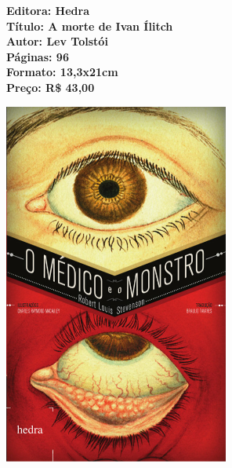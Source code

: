 \vfill

\noindent\begin{minipage}[c]{1\linewidth}
{\small\textbf{
\hspace*{-.1cm}Editora: Hedra\\
Título: A morte de Ivan Ílitch\\
Autor: Lev Tolstói\\ 
Páginas: 96\\
Formato: 13,3x21cm\\
Preço: R\$ 43,00\\
}}
\end{minipage}

\pagebreak


\begin{center}
\hspace*{-3.6cm}
\hspace*{3.1cm}\includegraphics[width=74mm]{./grid/medico.jpeg}
\end{center}

\hspace*{-7cm}\hrulefill\hspace*{-7cm}

\medskip

